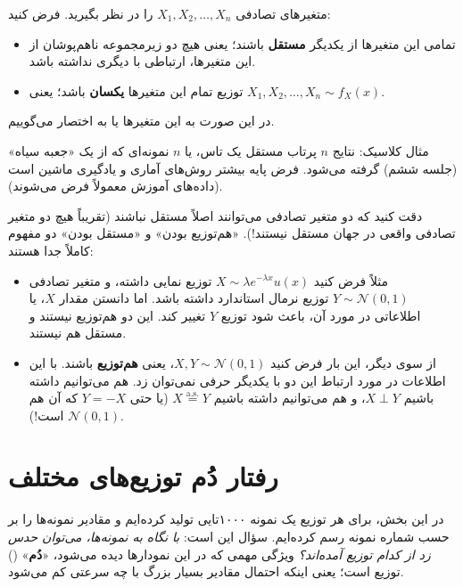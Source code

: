 \begin{definition}[\lr{i.i.d.}]
متغیرهای تصادفی $X_1,X_2,\ldots,X_n$ را در نظر بگیرید. فرض کنید:
\begin{itemize}
\item تمامی این متغیرها از یکدیگر \textbf{مستقل} باشند؛ یعنی هیچ دو زیرمجموعه ناهم‌پوشان از این متغیرها، ارتباطی با دیگری نداشته باشد.
\item توزیع تمام این متغیرها \textbf{یکسان} باشد؛ یعنی $X_1,X_2,\ldots,X_n\sim f_X(x)$.
\end{itemize}
در این صورت به این متغیرها  یا به اختصار  می‌گوییم.
\end{definition}

مثال کلاسیک: نتایج $n$ پرتاب مستقل یک تاس، یا $n$ نمونه‌ای که از یک «جعبه سیاه» (جلسه ششم) گرفته می‌شود. فرض  پایه بیشتر روش‌های آماری و یادگیری ماشین است (داده‌های آموزش معمولاً  فرض می‌شوند).

\begin{warning}
\warntitle دقت کنید که دو متغیر تصادفی می‌توانند اصلاً مستقل نباشند (تقریباً هیچ دو متغیر تصادفی واقعی در جهان مستقل نیستند!). «هم‌توزیع بودن» و «مستقل بودن» دو مفهوم کاملاً جدا هستند:
\begin{itemize}
\item مثلاً فرض کنید $X\sim\lambda e^{-\lambda x}u(x)$ توزیع نمایی داشته، و متغیر تصادفی $Y\sim\mathcal N(0,1)$ توزیع نرمال استاندارد داشته باشد. اما دانستن مقدار $X$، یا اطلاعاتی در مورد آن، باعث شود توزیع $Y$ تغییر کند. این دو هم‌توزیع نیستند و مستقل هم نیستند.
\item از سوی دیگر، این بار فرض کنید $X,Y\sim\mathcal N(0,1)$، یعنی \textbf{هم‌توزیع} باشند. با این اطلاعات در مورد ارتباط این دو با یکدیگر حرفی نمی‌توان زد. هم می‌توانیم داشته باشیم $X\perp Y$، و هم می‌توانیم داشته باشیم $X\overset{\text{a.s.}}{=}Y$ (یا حتی $Y=-X$ که آن هم $\mathcal N(0,1)$ است!).
\end{itemize}
\end{warning}

\section[رفتار دُم توزیع‌های مختلف]{رفتار دُم توزیع‌های مختلف\\ {\large{}}}

در این بخش، برای هر توزیع یک نمونه ۱۰۰۰تایی  تولید کرده‌ایم و مقادیر نمونه‌ها را بر حسب شماره نمونه رسم کرده‌ایم. سؤال این است: \emph{با نگاه به نمونه‌ها، می‌توان حدس زد از کدام توزیع آمده‌اند؟} ویژگی مهمی که در این نمودارها دیده می‌شود، «\textbf{دُم}» () توزیع است؛ یعنی اینکه احتمال مقادیر بسیار بزرگ با چه سرعتی کم می‌شود.


